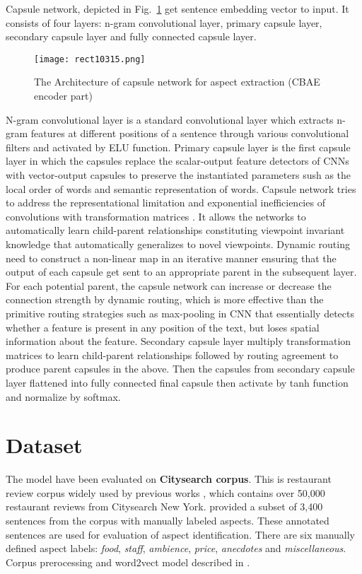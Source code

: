 \documentclass{article}
\begin{document}
Capsule network, depicted in Fig.~\ref{fig:capsule} get sentence embedding vector to input. It consists of four layers: n-gram convolutional layer, primary capsule layer, secondary capsule layer and fully connected capsule layer.

\begin{figure}[!tbh]
    \centering
    \texttt{[image: rect10315.png]}
    \caption{The Architecture of capsule network for aspect extraction (CBAE encoder part)}
    \label{fig:capsule}
\end{figure}

N-gram convolutional layer is a standard convolutional layer which extracts n-gram features at different positions of a sentence through various convolutional filters\cite{Zhao2018} and activated by ELU function. Primary capsule layer is the first capsule layer in which the capsules replace the scalar-output feature detectors of CNNs with vector-output capsules to preserve the instantiated parameters sush as the local order of words and semantic representation of words. Capsule network tries to address the representational limitation and exponential inefficiencies of convolutions with transformation matrices \cite{Hinton2017DRBC}. It allows the networks to automatically learn child-parent relationships constituting viewpoint invariant knowledge that automatically generalizes to novel viewpoints. Dynamic routing need to construct a non-linear map in an iterative manner ensuring that the output of each capsule get sent to an appropriate parent in the subsequent layer. For each potential parent, the capsule network can increase or decrease the connection strength by dynamic routing, which is more effective than the primitive routing strategies such as max-pooling in CNN that essentially detects whether a feature is present in any position of the text, but loses spatial information about the feature. Secondary capsule layer multiply transformation matrices to learn child-parent relationships followed by routing agreement to produce parent capsules in the above. Then the capsules from secondary capsule layer flattened into fully connected final capsule then activate by tanh function and normalize by softmax.


\section{Dataset}
The model have been evaluated on \textbf{Citysearch corpus}. This is restaurant review corpus widely used by previous works \cite{Ganu2009BeyondTheStars} \cite{Brody2010UAS} \cite{Zhao2010JMA}, which contains over 50,000 restaurant reviews from Citysearch New York. \cite{Ganu2009BeyondTheStars} provided a subset of 3,400 sentences from the corpus with manually labeled aspects. These annotated sentences are used for evaluation of aspect identification. There are six manually defined aspect labels: \textit{food}, \textit{staff}, \textit{ambience}, \textit{price}, \textit{anecdotes} and \textit{miscellaneous}. Corpus prerocessing and word2vect model described in \cite{He2018ABAE}.
\end{document}
